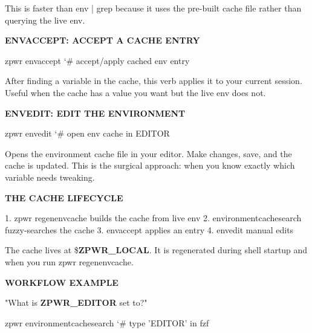 \documentclass[11pt,a4paper,twoside]{book}
\begin{document}
This is faster than env | grep because it uses the pre-built cache file rather than querying the live env.


\vspace{12pt}
{\bfseries\color{neonyellow} ENVACCEPT: ACCEPT A CACHE ENTRY}\vspace{4pt}

\begin{codebox}
\color{neongreen}zpwr envaccept                      {\char`\#} accept/apply cached env entry\\
\end{codebox}

After finding a variable in the cache, this verb applies it to your current session. Useful when the cache has a value you want but the live env does not.


\vspace{12pt}
{\bfseries\color{neonyellow} ENVEDIT: EDIT THE ENVIRONMENT}\vspace{4pt}

\begin{codebox}
\color{neongreen}zpwr envedit                        {\char`\#} open env cache in EDITOR\\
\end{codebox}

Opens the environment cache file in your editor. Make changes, save, and the cache is updated. This is the surgical approach: when you know exactly which variable needs tweaking.


\vspace{12pt}
{\bfseries\color{neonyellow} THE CACHE LIFECYCLE}\vspace{4pt}

1. zpwr regenenvcache   builds the cache from live env 2. environmentcachesearch fuzzy-searches the cache 3. envaccept             applies an entry 4. envedit               manual edits

The cache lives at \$\textbf{ZPWR\_LOCAL}. It is regenerated during shell startup and when you run zpwr regenenvcache.


\vspace{12pt}
{\bfseries\color{neonyellow} WORKFLOW EXAMPLE}\vspace{4pt}

"What is \textbf{ZPWR\_EDITOR} set to?"

\begin{codebox}
\color{neongreen}zpwr environmentcachesearch    {\char`\#} type 'EDITOR' in fzf\\
\end{codebox}
\end{document}
